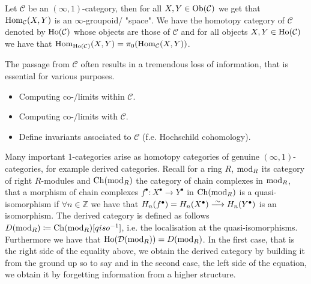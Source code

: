 \begin{rmk}
    Let $ \mathcal{ C } $ be an $ ( \infty , 1 ) $-category, then for all $ X , Y \in \operatorname{Ob} ( \mathcal{ C } ) $ we get that $ \operatorname{Hom}_{ \mathcal{ C } } ( X , Y )$ is an $\infty$-groupoid/ "space".
    We have the homotopy category of $ \mathcal{ C } $ denoted by $ \operatorname{Ho} ( \mathcal{ C } )$ whose objects are those of $ \mathcal{ C } $ and for all objects $ X , Y \in \operatorname{Ho} ( \mathcal{ C } ) $ we have that $ \operatorname{Hom}_{ \operatorname{Ho} ( \mathcal{ C } ) } ( X , Y ) = \pi_0 ( \operatorname{Hom}_{ \mathcal{ C } } ( X , Y ) )$.
\end{rmk}

\begin{Warning}
    The passage from $ \mathcal{ C } $ often results in a tremendous loss of information, that is essential for various purposes.
    \begin{itemize}
        \item 
        Computing co-/limits within $ \mathcal{ C } $.

        \item 
        Computing co-/limits with $ \mathcal{ C } $.

        \item 
        Define invariants associated to $ \mathcal{ C } $ (f.e. Hochschild cohomology).
    \end{itemize}
\end{Warning}


\begin{rmd}
    Many important 1-categories arise as homotopy categories of genuine $ ( \infty , 1 ) $-categories, for example derived categories.
    Recall for a ring $ R $, $ \operatorname{mod}_R $ its category of right $ R $-modules and $ \operatorname{Ch} ( \operatorname{mod}_R ) $ the category of chain complexes in $ \operatorname{mod}_R $, that a morphism of chain complexes $ f^\bullet \colon X^\bullet \to Y^\bullet $ in $ \operatorname{Ch} ( \operatorname{mod}_R ) $ is a quasi-isomorphism if $ \forall n \in \mathbb{ Z } $ we have that $ H_n ( f^\bullet ) = H_n ( X^\bullet ) \isomorphism H_n ( Y^\bullet ) $ is an isomorphism.
    The derived category is defined as follows $ D ( \operatorname{mod}_R ) \coloneqq \operatorname{Ch} ( \operatorname{mod}_R ) [qiso^{-1}] $, i.e. the localisation at the quasi-isomorphisms.
    Furthermore we have that $ \operatorname{Ho} ( \mathcal{ D } ( \operatorname{mod}_R ) ) = D ( \operatorname{mod}_R) $.
    In the first case, that is the right side of the equality above, we obtain the derived category by building it from the ground up so to say and in the second case, the left side of the equation, we obtain it by forgetting information from a higher structure.
\end{rmd}

